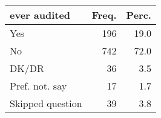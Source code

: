 \begin{table}[ht]
\centering
\begin{tabular}{lrr}
  \hline
ever audited & Freq. & Perc. \\ 
  \hline
Yes & 196 & 19.0 \\ 
  No & 742 & 72.0 \\ 
  DK/DR & 36 & 3.5 \\ 
  Pref. not. say & 17 & 1.7 \\ 
  Skipped question & 39 & 3.8 \\ 
   \hline
\end{tabular}
\end{table}
